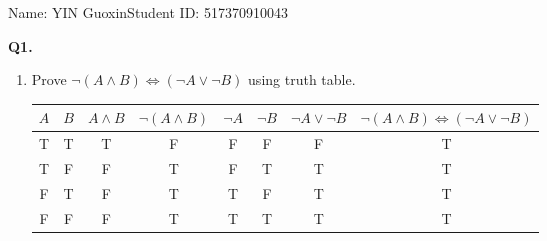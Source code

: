 \documentclass{article}[12pt]
\begin{document}
\noindent

\noindent{}
\begin{center}
\footnotesize{\quad Name: YIN Guoxin\quad Student ID: 517370910043}


\end{center}

\noindent \textbf{Q1.}
\begin{enumerate}
\item Prove $\neg (A\wedge B) \Longleftrightarrow (\neg A \vee \neg B)$ using truth table.
\begin{table}[H]
\centering
\begin{tabular}{c|c|||c||c||c|c||c|||c}
$A$ & $B$ & $A\wedge B$ & $\neg (A\wedge B)$ & $\neg A $& $\neg B $&$\neg A \vee \neg B $&$ \neg (A\wedge B) \Longleftrightarrow (\neg A \vee \neg B) $\\ \hline
T & T & T                        & F                                              & F                     & F                     & F                                                               & T                                                                                                                                               \\
T & F & F                        & T                                              & F                     & T                     & T                                                               & T                                                                                                                                               \\
F & T & F                        & T                                              & T                     & F                     & T                                                               & T                                                                                                                                               \\
F & F & F                        & T                                              & T                     & T                     & T                                                               & T                                                                                                                                              
                                                                                                                                                

\end{tabular}
\end{table}
\end{enumerate}
\end{document}
